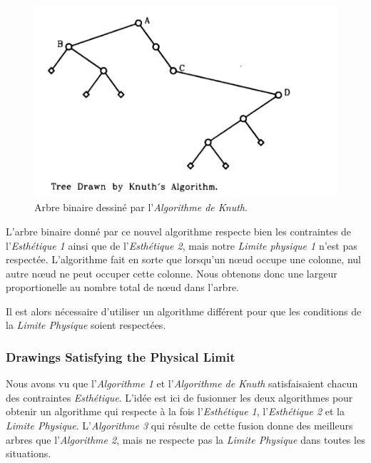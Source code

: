 \documentclass{article}
\begin{document}
    \vfill
    \begin{figure}[h]
    		\begin{center}
    			\includegraphics[scale=0.5]{arbreBinaire.png}
    		\end{center}
    	\caption{Arbre binaire dessiné par l'\emph{Algorithme de Knuth}. \cite{article79}}
      \label{fig:arbreBinaire}
    \end{figure}
    \vfill

    L'arbre binaire donné par ce nouvel algorithme respecte bien les contraintes de l'\emph{Esthétique 1} ainsi que de l'\emph{Esthétique 2}, mais notre \emph{Limite physique 1} n'est pas respectée. L'algorithme fait en sorte que lorsqu’un n\oe{}ud occupe une colonne, nul autre n\oe{}ud ne peut occuper cette colonne. Nous obtenons donc une largeur proportionelle au nombre total de n\oe{}ud dans l'arbre.

    Il est alors nécessaire d'utiliser un algorithme différent pour que les conditions de la \emph{Limite Physique} soient respectées.

\newpage
    \subsubsection{Drawings Satisfying the Physical Limit}

    Nous avons vu que l'\emph{Algorithme 1} et l'\emph{Algorithme de Knuth} satisfaisaient chacun des contraintes \emph{Esthétique}. L'idée est ici de fusionner les deux algorithmes pour obtenir un algorithme qui respecte à la fois l'\emph{Esthétique 1}, l'\emph{Esthétique 2} et la \emph{Limite Physique}. L'\emph{Algorithme 3} qui résulte de cette fusion donne des meilleurs arbres que l'\emph{Algorithme 2}, mais ne respecte pas la \emph{Limite Physique} dans toutes les situations.
\end{document}
